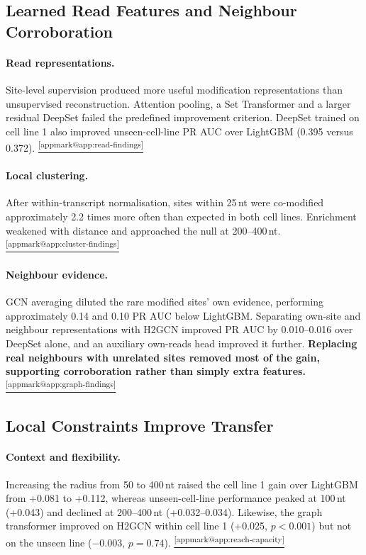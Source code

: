 \documentclass[11pt,a4paper]{article}
\makeatletter
\DeclareRobustCommand{\applink}[1]{%
    \hyperref[#1]{\textsuperscript{\ref*{appmark@#1}}}}
\makeatother
\begin{document}
\subsection{Learned Read Features and Neighbour Corroboration}
\label{sec:dev}
\paragraph{Read representations.}\label{sec:reads}
Site-level supervision produced more useful modification representations
than unsupervised reconstruction. Attention pooling, a Set Transformer
and a larger residual DeepSet failed the predefined improvement criterion.
DeepSet trained on cell line 1 also improved unseen-cell-line PR AUC over
LightGBM (0.395 versus 0.372).
\applink{app:read-findings}

\paragraph{Local clustering.}\label{sec:cluster}
After within-transcript normalisation, sites within 25\,nt
were co-modified approximately 2.2 times more often than
expected in both cell lines. Enrichment weakened with
distance and approached the null at 200--400\,nt.
\applink{app:cluster-findings}

\paragraph{Neighbour evidence.}\label{sec:graph}
GCN averaging diluted the rare modified sites' own evidence, performing
approximately 0.14 and 0.10 PR AUC below LightGBM. Separating own-site and
neighbour representations with H2GCN improved PR AUC by 0.010--0.016 over
DeepSet alone, and an auxiliary own-reads head improved it further.
\textbf{Replacing real neighbours with unrelated sites removed most of the gain,
supporting corroboration rather than simply extra features.}\applink{app:graph-findings}

\subsection{Local Constraints Improve Transfer}
\paragraph{Context and flexibility.}\label{sec:reach}\label{sec:capacity}
Increasing the radius from 50 to 400\,nt raised the cell line 1 gain over
LightGBM from +0.081 to +0.112, whereas unseen-cell-line performance peaked
at 100\,nt (+0.043) and declined at 200--400\,nt (+0.032--0.034).
Likewise, the graph transformer improved on H2GCN within cell line 1
(+0.025, $p<0.001$) but not on the unseen line ($-0.003$, $p=0.74$).
\applink{app:reach-capacity}
\end{document}
